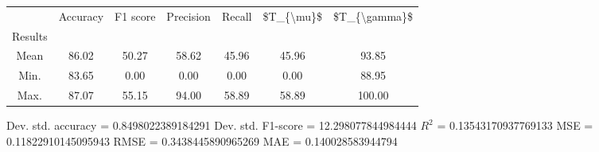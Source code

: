 \begin{tabular}{|c|c|c|c|c|c|c|}
\toprule
{} &  Accuracy &  F1 score &  Precision &  Recall &  \$T\_\{\textbackslash mu\}\$ &  \$T\_\{\textbackslash gamma\}\$ \\
Results &           &           &            &         &            &               \\
\hline
Mean    &     86.02 &     50.27 &      58.62 &   45.96 &      45.96 &         93.85 \\
Min.    &     83.65 &      0.00 &       0.00 &    0.00 &       0.00 &         88.95 \\
Max.    &     87.07 &     55.15 &      94.00 &   58.89 &      58.89 &        100.00 \\
\bottomrule
\end{tabular}

 Dev. std. accuracy = 0.8498022389184291
 Dev. std. F1-score = 12.298077844984444
 $R^2$ = 0.13543170937769133
 MSE = 0.11822910145095943
 RMSE = 0.3438445890965269
 MAE = 0.140028583944794